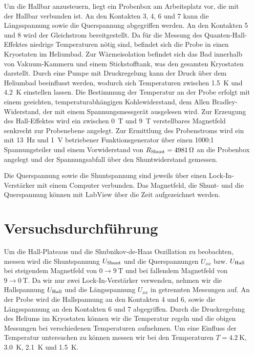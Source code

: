 \documentclass[paper=a4,fontsize=10pt,DIV=18,twocolumn,parskip=half]{scrartcl}
\numberwithin{equation}{section}    %
\begin{document}
Um die Hallbar anzusteuern, liegt ein Probenbox am Arbeitsplatz vor, die mit der Hallbar verbunden ist. An den Kontakten 3, 4, 6 und 7 kann die Längsspannung sowie die Querspannung abgegriffen werden. An den Kontakten 5 und 8 wird der Gleichstrom bereitgestellt.
Da für die Messung des Quanten-Hall-Effektes niedrige Temperaturen nötig sind, befindet sich die Probe in einen Kryostaten im Heliumbad. Zur Wärmeisolation befindet sich das Bad innerhalb von Vakuum-Kammern und einem Stickstofftank, was den gesamten Kryostaten darstellt. Durch eine Pumpe mit Druckregelung kann der Druck über dem Heliumbad beeinflusst werden, wodurch sich Temperaturen zwischen \SI{1.5}{\kelvin} und \SI{4.2}{\kelvin} einstellen lassen. Die Bestimmung der Temperatur an der Probe erfolgt mit einem geeichten, temperaturabhängigen Kohlewiderstand, dem Allen Bradley-Widerstand, der mit einem Spannungsmessgerät ausgelesen wird. Zur Erzeugung des Hall-Effektes wird ein zwischen \SI{0}{\tesla} und \SI{9}{\tesla} verstellbares Magnetfeld senkrecht zur Probenebene angelegt. Zur Ermittlung des Probenstroms
wird ein mit \SI{13}{\hertz} und \SI{1}{\volt} betriebener Funktionsgenerator über einen 1000:1 Spannungsteiler und einem Vorwiderstand von $R_{\rm Shunt} = \SI{4981}{\ohm}$ an die Probenbox angelegt und der Spannungsabfall über den Shuntwiderstand gemessen.

Die Querspannung sowie die Shuntspannung sind jeweils über einen Lock-In-Verstärker mit einem Computer verbunden.
Das Magnetfeld, die Shunt- und die Querspannung können mit LabView über die Zeit aufgezeichnet werden.

\section{Versuchsdurchführung}
\label{versuch}
%
Um die Hall-Plateaus und die Shubnikov-de-Haas Oszillation zu beobachten, messen wird die Shuntspannung $U_{\rm Shunt}$ und die Querspannungen $U_{xx}$ bzw. $U_{\rm Hall}$ bei steigendem Magnetfeld von $0 \rightarrow \SI{9}{\tesla}$ und bei fallendem Magnetfeld von $9 \rightarrow \SI{0}{\tesla}$. Da wir nur zwei Lock-In-Verstärker verwenden, nehmen wir die Hallspannung $U_{\rm Hall}$ und die Längsspannung $U_{xx}$ in getrennten Messungen auf. An der Probe wird die Hallspannung an den Kontakten 4 und 6, sowie die Längsspannung an den Kontakten 6 und 7 abgegriffen. Durch die Druckregelung des Heliums im Kryostaten können wir die Temperatur regeln und die obigen Messungen bei verschiedenen Temperaturen aufnehmen.
Um eine Einfluss der Temperatur untersuchen zu können messen wir bei den Temperaturen $T=\SI{4.2}{\kelvin}$, \SI{3.0}{\kelvin}, \SI{2.1}{\kelvin} und \SI{1.5}{\kelvin}.
\end{document}
